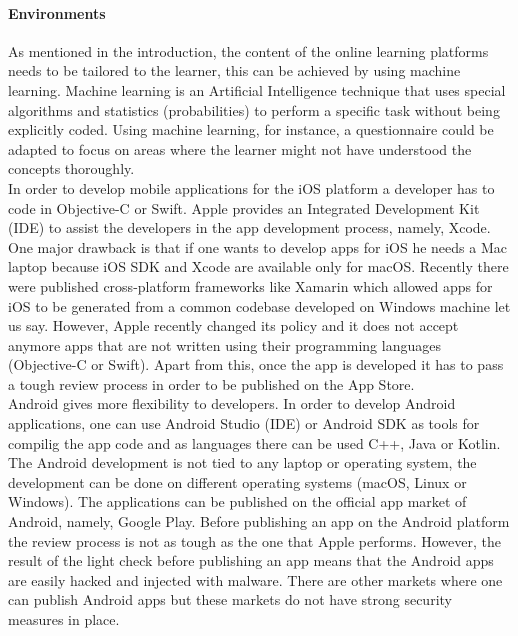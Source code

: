 \documentclass[11]{article}
\begin{document}
	\paragraph{Environments\\}
	As mentioned in the introduction, the content of the online learning platforms needs to be tailored to the learner, this can be achieved by using machine learning. Machine learning is an Artificial Intelligence technique that uses special algorithms and statistics (probabilities) to perform a specific task without being explicitly coded. Using machine learning, for instance, a questionnaire could be adapted to focus on areas where the learner might not have understood the concepts thoroughly.\\
	In order to develop mobile applications for the iOS platform a developer has to code in Objective-C or Swift. Apple provides an Integrated Development Kit (IDE) to assist the developers in the app development process, namely, Xcode. One major drawback is that if one wants to develop apps for iOS he needs a Mac laptop because iOS SDK and Xcode are available only for macOS.  Recently there were published cross-platform frameworks like Xamarin which allowed apps for iOS to be generated from a common codebase developed on Windows machine let us say. However, Apple recently changed its policy and it does not accept anymore apps that are not written using their programming languages  (Objective-C or Swift). Apart from this, once the app is developed it has to pass a tough review process in order to be published on the App Store.\\
	Android gives more flexibility to developers. In order to develop Android applications, one can use Android Studio (IDE) or Android SDK as tools for compilig the app code and as languages there can be used C++, Java or Kotlin. The Android development is not tied to any laptop or operating system, the development can be done on different operating systems (macOS, Linux or Windows). The applications can be published on the official app market of Android, namely, Google Play. Before publishing an app on the Android platform the review process is not as tough as the one that Apple performs.  However, the result of the light check before publishing an app means that the Android apps are easily hacked and injected with malware. There are other markets where one can publish Android apps but these markets do not have strong security measures in place.
\end{document}
